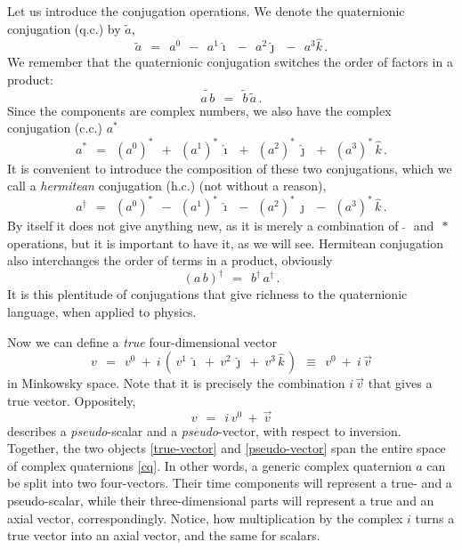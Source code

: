 \documentclass[epsfig,12pt]{article}
\newcommand{\wt}{\widetilde}
\newcommand{\ii}{\hat\imath}
\newcommand{\jj}{\hat\jmath}
\newcommand{\kk}{\hat k}
\begin{document}
	Let us introduce the conjugation operations.
	We denote the quaternionic conjugation (q.c.) by $ \wt a $,
\begin{equation}
	\wt a	~~=~~	a^0  ~~-~~  a^1 \ii  ~~-~~  a^2 \jj  ~~-~~ a^3 \kk\,.
\end{equation}
	We remember that the quaternionic conjugation switches the order of factors in a product:
\begin{equation}
	\wt{a\, b}  ~~=~~  \wt b\, \wt a\,.
\end{equation}
	Since the components are complex numbers, we also have the complex conjugation (c.c.) $ a^* $
\begin{equation}
	a^*	~~=~~	(a^0)^*  ~~+~~  (a^1)^*\, \ii  ~~+~~  (a^2)^*\, \jj  ~~+~~  (a^3)^*\, \kk\,.
\end{equation}
	It is convenient to introduce the composition of these two conjugations, which we call a \emph{hermitean}
	conjugation (h.c.) (not without a reason),
\begin{equation}
	a^\dag	~~=~~	(a^0)^*  ~~-~~  (a^1)^*\, \ii  ~~-~~  (a^2)^*\, \jj  ~~-~~  (a^3)^*\, \kk\,.
\end{equation}
	By itself it does not give anything new, as it is merely a combination of $ \,\wt{~}\, $ and $ \,*\, $ operations,
	but it is important to have it, as we will see.
	Hermitean conjugation also interchanges the order of terms in a product, obviously
\begin{equation}
	(a\, b)^\dag	~~=~~	b^\dag\, a^\dag\,.
\end{equation}
	It is this plentitude of conjugations that give richness to the quaternionic language, when applied to physics.

	Now we can define a \emph{true} four-dimensional vector
\begin{equation}
\label{true-vector}
	v	~~=~~	v^0  ~+~  i\,(\, v^1\,\ii  ~+~  v^2\,\jj  ~+~ v^3\,\kk \,)
		~~\equiv~~	v^0  ~+~  i\,\vec v
\end{equation}
	in Minkowsky space.
	Note that it is precisely the combination $ i\,\vec v $ that gives a true vector.
	Oppositely,
\begin{equation}
\label{pseudo-vector}
	v	~~=~~	i\,v^0  ~+~  \vec v
\end{equation}
	describes a \emph{pseudo}-scalar and a \emph{pseudo}-vector, with respect to inversion.
	Together, the two objects \eqref{true-vector} and \eqref{pseudo-vector} span the entire space of 
	complex quaternions \eqref{cq}.
	In other words, a generic complex quaternion $ a $ can be split into two four-vectors.
	Their time components will represent a true- and a pseudo-scalar, while their three-dimensional
	parts will represent a true and an axial vector, correspondingly.
	Notice, how multiplication by the complex $ i $ turns a true vector into an axial vector, and
	the same for scalars.
\end{document}
